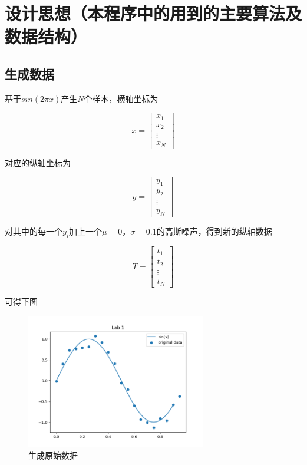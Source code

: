 \section{设计思想（本程序中的用到的主要算法及数据结构）}

\subsection{生成数据}

基于$sin(2\pi x)$产生$N$个样本，横轴坐标为

\begin{equation}
    x =
    \begin{bmatrix}
        x_1 \\ x_2 \\ \vdots \\ x_N
    \end{bmatrix}
\end{equation}

对应的纵轴坐标为

\begin{equation}
    y =
    \begin{bmatrix}
        y_1 \\ y_2 \\ \vdots \\ y_N
    \end{bmatrix}
\end{equation}

对其中的每一个$y_i$加上一个$\mu = 0$，$\sigma = 0.1$的高斯噪声，得到新的纵轴数据

\begin{equation}
    T =
    \begin{bmatrix}
        t_1 \\ t_2 \\ \vdots \\ t_N
    \end{bmatrix}
\end{equation}

可得下图

\begin{figure}[H]
    \centering
    \includegraphics[width=0.7\textwidth]{figures/Figure_1.png}
    \caption{生成原始数据}
\end{figure}

